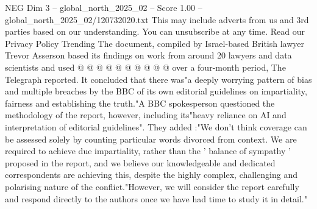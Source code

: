 \begin{textsample}{NEG Dim 3 – global\_north\_2025\_02 – Score 1.00 – global\_north\_2025\_02/120732020.txt}
This may include adverts from us and 3rd parties based on our understanding.
You can unsubscribe at any time.
Read our Privacy Policy Trending The document, compiled by Israel-based British lawyer Trevor Asserson based its findings on work from around 20 lawyers and data scientists and used @ @ @ @ @ @ @ @ @ @ over a four-month period, The Telegraph reported.
It concluded that there was"a deeply worrying pattern of bias and multiple breaches by the BBC of its own editorial guidelines on impartiality, fairness and establishing the truth."A BBC spokesperson questioned the methodology of the report, however, including its"heavy reliance on AI and interpretation of editorial guidelines".
They added :"We don't think coverage can be assessed solely by counting particular words divorced from context.
We are required to achieve due impartiality, rather than the ' balance of sympathy ' proposed in the report, and we believe our knowledgeable and dedicated correspondents are achieving this, despite the highly complex, challenging and polarising nature of the conflict."However, we will consider the report carefully and respond directly to the authors once we have had time to study it in detail."

\end{textsample}

